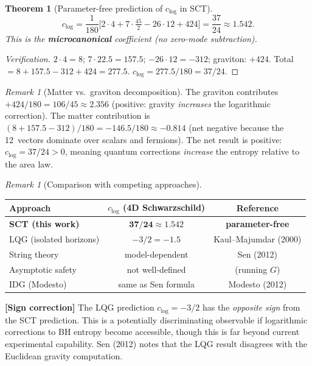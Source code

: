 \documentclass[12pt,a4paper]{article}
\newtheorem{theorem}[proposition]{Theorem}
\theoremstyle{definition}
\theoremstyle{remark}
\newtheorem{remark}[proposition]{Remark}
\newcommand{\signcorrection}[1]{%
  \par\noindent\colorbox{red!10}{%
    \parbox{\dimexpr\linewidth-2\fboxsep}{%
      \textcolor{red!50!black}{\textbf{[Sign correction]}}
      \textcolor{red!50!black}{#1}%
    }%
  }\par%
}
\begin{document}
\begin{theorem}[Parameter-free prediction of $c_{\log}$ in SCT]
\label{thm:clog}
\begin{equation}\label{eq:clog-sct}
  \boxed{
  c_{\log} = \frac{1}{180}\bigl[
    2 \cdot 4 + 7 \cdot \tfrac{45}{2} - 26 \cdot 12 + 424
  \bigr]
  = \frac{37}{24}
  \approx 1.542.}
\end{equation}
This is the \textbf{microcanonical} coefficient (no zero-mode
subtraction).
\end{theorem}

\begin{proof}[Verification]
$2 \cdot 4 = 8$; $7 \cdot 22.5 = 157.5$; $-26 \cdot 12 = -312$;
graviton: $+424$.  Total $= 8 + 157.5 - 312 + 424 = 277.5$.
$c_{\log} = 277.5/180 = 37/24$.
\end{proof}

\begin{remark}[Matter vs.\ graviton decomposition]
The graviton contributes $+424/180 = 106/45 \approx 2.356$
(positive: gravity \emph{increases} the logarithmic correction).
The matter contribution is $(8 + 157.5 - 312)/180 = -146.5/180
\approx -0.814$ (net negative because the 12~vectors dominate
over scalars and fermions).
The net result is positive: $c_{\log} = 37/24 > 0$, meaning quantum
corrections \emph{increase} the entropy relative to the area law.
\end{remark}

\begin{remark}[Comparison with competing approaches]
\begin{center}
\begin{tabular}{lcc}
\toprule
Approach & $c_{\log}$ (4D Schwarzschild) & Reference \\
\midrule
\textbf{SCT (this work)} & $\mathbf{37/24 \approx 1.542}$
  & \textbf{parameter-free} \\
LQG (isolated horizons) & $-3/2 = -1.5$
  & Kaul--Majumdar (2000) \\
String theory & model-dependent
  & Sen (2012) \\
Asymptotic safety & not well-defined
  & (running $G$) \\
IDG (Modesto) & same as Sen formula
  & Modesto (2012) \\
\bottomrule
\end{tabular}
\end{center}

\signcorrection{The LQG prediction $c_{\log} = -3/2$ has the
\emph{opposite sign} from the SCT prediction.  This is a potentially
discriminating observable if logarithmic corrections to BH entropy
become accessible, though this is far beyond current experimental
capability.  Sen (2012) notes that the LQG result disagrees with the
Euclidean gravity computation.}
\end{remark}
\end{document}
